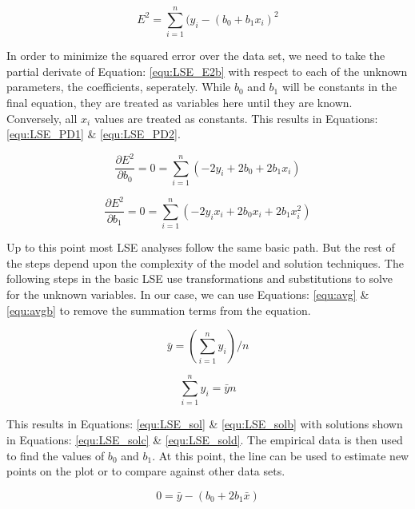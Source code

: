 \begin{equation}
\label{equ:LSE_E2b}
E^2 = \sum_{i=1}^{n} (y_i - (b_0 + b_1 x_i)^2
\end{equation}

In order to minimize the squared error over the data set, we need to take the partial derivate of Equation: \eqref{equ:LSE_E2b} with respect to each of the unknown parameters, the coefficients, seperately. While $b_0$ and $b_1$ will be constants in the final equation, they are treated as variables here until they are known. Conversely, all $x_i$ values are treated as constants. This results in Equations: \eqref{equ:LSE_PD1} \& \eqref{equ:LSE_PD2}.

\begin{equation}
\label{equ:LSE_PD1}
\frac{\partial E^2}{\partial b_0} = 0 = \sum_{i=1}^{n} (-2y_i +2b_0 + 2b_1 x_i)
\end{equation}

\begin{equation}
\label{equ:LSE_PD2}
\frac{\partial E^2}{\partial b_1} = 0 = \sum_{i=1}^{n} (-2y_i x_i +2b_0 x_i + 2b_1 x_i^2)
\end{equation}

Up to this point most LSE analyses follow the same basic path. But the rest of the steps depend upon the complexity of the model and solution techniques. The following steps in the basic LSE use transformations and substitutions to solve for the unknown variables. In our case, we can use Equations: \eqref{equ:avg} \& \eqref{equ:avgb} to remove the summation terms from the equation.

\begin{equation}
\label{equ:avg} 
\bar{y} = (\sum_{i=1}^{n} y_i) / n
\end{equation}

\begin{equation}
\label{equ:avgb} 
\sum_{i=1}^{n} y_i  = \bar{y}n
\end{equation}

This results in Equations: \eqref{equ:LSE_sol} \& \eqref{equ:LSE_solb} with solutions shown in Equations: \eqref{equ:LSE_solc} \& \eqref{equ:LSE_sold}. The empirical data is then used to find the values of $b_0$ and $b_1$. At this point, the line can be used to estimate new points on the plot or to compare against other data sets.

\begin{equation}
\label{equ:LSE_sol}
0 = \bar{y} - (b_0 + 2b_1 \bar{x})
\end{equation}

